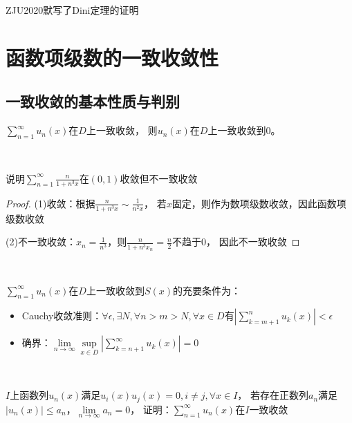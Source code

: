 \begin{note}
  ZJU2020默写了Dini定理的证明
\end{note}

\section{函数项级数的一致收敛性}

\subsection{一致收敛的基本性质与判别}

\begin{theorem}[一致收敛性质]
  $\sum\limits_{n = 1}^{\infty}u_n(x)$在$D$上一致收敛，
  则$u_n(x)$在$D$上一致收敛到$0$。
\end{theorem}

~

\begin{exercise}[收敛但不一致收敛的级数]
  说明$\sum\limits_{n = 1}^{\infty}\frac{n}{1 + n^3x}$在$(0,1)$收敛但不一致收敛
\end{exercise}

\begin{proof}
  (1)收敛：根据$\frac{n}{1 + n^3 x} \sim \frac{1}{n^2x}$，
  若$x$固定，则作为数项级数收敛，因此函数项级数收敛

  (2)不一致收敛：$x_n = \frac{1}{n^3}$，则$\frac{n}{1 + n^3x_n} = \frac{n}{2}$不趋于$0$，
  因此不一致收敛
\end{proof}

~

\begin{theorem}[一致收敛充要条件]
  $\sum\limits_{n = 1}^{\infty}u_n(x)$在$D$上一致收敛到$S(x)$的充要条件为：
  \begin{itemize}
  \item Cauchy收敛准则：$\forall \epsilon, \exists N, \forall n>m>N, \forall x \in D$有$|\sum\limits_{k = m+1}^nu_k(x)| < \epsilon$
  \item 确界：$\lim \limits _{n \rightarrow \infty} \sup \limits_{x \in D}|\sum\limits_{k = n+1}^{\infty}u_k(x)| = 0$
  \end{itemize}
\end{theorem}

~

\begin{exercise}
  $I$上函数列$u_n(x)$满足$u_i(x)u_j(x) = 0, i \neq j, \forall x \in I$，
  若存在正数列$a_n$满足$|u_n(x)| \leq a_n$，$\lim \limits _{n \rightarrow \infty} a_n = 0$，
  证明：$\sum\limits_{n = 1}^{\infty} u_n(x)$在$I$一致收敛
\end{exercise}

